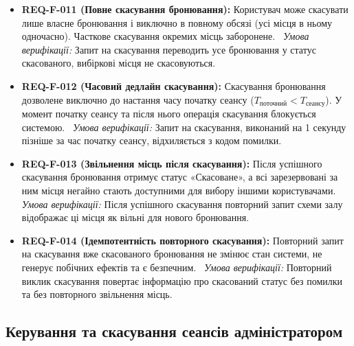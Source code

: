\begin{itemize}[leftmargin=*,labelindent=0pt]
    \item \textbf{REQ-F-011 (Повне скасування бронювання):} Користувач може скасувати лише власне бронювання і виключно в повному обсязі (усі місця в ньому одночасно). Часткове скасування окремих місць заборонене.~
    \textit{Умова верифікації:} Запит на скасування переводить усе бронювання у статус скасованого, вибіркові місця не скасовуються.
    
    \item \textbf{REQ-F-012 (Часовий дедлайн скасування):} Скасування бронювання дозволене виключно до настання часу початку сеансу ($T_{\text{поточний}} < T_{\text{сеансу}}$). У момент початку сеансу та після нього операція скасування блокується системою.~
    \textit{Умова верифікації:} Запит на скасування, виконаний на 1 секунду пізніше за час початку сеансу, відхиляється з кодом помилки.
    
    \item \textbf{REQ-F-013 (Звільнення місць після скасування):} Після успішного скасування бронювання отримує статус «Скасоване», а всі зарезервовані за ним місця негайно стають доступними для вибору іншими користувачами.~
    \textit{Умова верифікації:} Після успішного скасування повторний запит схеми залу відображає ці місця як вільні для нового бронювання.
    
    \item \textbf{REQ-F-014 (Ідемпотентність повторного скасування):} Повторний запит на скасування вже скасованого бронювання не змінює стан системи, не генерує побічних ефектів та є безпечним.~
    \textit{Умова верифікації:} Повторний виклик скасування повертає інформацію про скасований статус без помилки та без повторного звільнення місць.
\end{itemize}

\subsection{Керування та скасування сеансів адміністратором}\label{sec:funktsional-admin}

